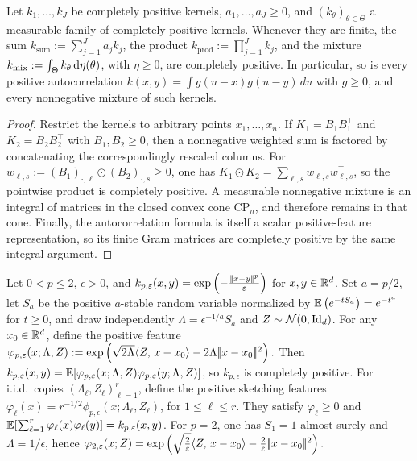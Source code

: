 \begin{prop}
\label{prop-completely-positive-kernel-closure}
Let \(k_1,\ldots,k_J\) be completely positive kernels, \(a_1,\ldots,a_J\geq0\), and \((k_\theta)_{\theta\in\Theta}\) a measurable family of completely positive kernels. Whenever they are finite, the sum \(k_{\mathrm{sum}}:=\sum_{j=1}^J a_jk_j\), the product \(k_{\mathrm{prod}}:=\prod_{j=1}^J k_j\), and the mixture \(k_{\mathrm{mix}}:=\int_\Theta k_\theta\,\mathrm{d}\eta(\theta)\), with \(\eta\geq0\), are completely positive. In particular, so is every positive autocorrelation
$k(x,y)=\int g(u-x)g(u-y)\,du$ with $g\geq0$,
and every nonnegative mixture of such kernels.
\end{prop}
\begin{proof}
Restrict the kernels to arbitrary points \(x_1,\ldots,x_n\). If \(K_1=B_1B_1^\top\) and \(K_2=B_2B_2^\top\) with \(B_1,B_2\geq0\), then a nonnegative weighted sum is factored by concatenating the correspondingly rescaled columns. For \(w_{\ell,s}:=(B_1)_{\cdot,\ell}\odot(B_2)_{\cdot,s}\geq0\), one has \(K_1\odot K_2=\sum_{\ell,s}w_{\ell,s}w_{\ell,s}^\top\), so the pointwise product is completely positive. A measurable nonnegative mixture is an integral of matrices in the closed convex cone \(\mathrm{CP}_n\), and therefore remains in that cone. Finally, the autocorrelation formula is itself a scalar positive-feature representation, so its finite Gram matrices are completely positive by the same integral argument.
\end{proof}
\begin{prop}
\label{prop-gaussian-positive-features}
Let \(0<p\leq2\), \(\epsilon>0\), and
$k_{p,\varepsilon}(x,y) = \exp\left( -\frac{|\!| x-y |\!|^p}{\varepsilon} \right)$ for $x,y\in\mathbb{R}^d$.
Set \(a=p/2\), let \(S_a\) be the positive \(a\)-stable random variable normalized by
$\mathbb{E}\left( e^{-tS_a} \right)=e^{-t^a}$ for $t\geq0$,
and draw independently \(\Lambda=\epsilon^{-1/a}S_a\) and \(Z\sim\mathcal{N}(0,\mathrm{Id}_d)\).
For any \(x_0\in\mathbb{R}^d\), define the positive feature
\(\varphi_{p,\varepsilon}(x;\Lambda,Z) := \exp\left(  \sqrt{2\Lambda}\langle Z,\,x-x_0\rangle -2\Lambda|\!| x-x_0 |\!|^2  \right).\)
Then \(k_{p,\varepsilon}(x,y)=\mathbb{E}[\varphi_{p,\varepsilon}(x;\Lambda,Z)\varphi_{p,\varepsilon}(y;\Lambda,Z)]\), so \(k_{p,\epsilon}\) is completely positive. For i.i.d.\ copies \((\Lambda_\ell,Z_\ell)_{\ell=1}^r\), define the positive sketching features \(\varphi_\ell(x)=r^{-1/2}\phi_{p,\epsilon}(x;\Lambda_\ell,Z_\ell)\), for \(1\leq\ell\leq r\).
They satisfy \(\varphi_\ell\geq0\) and \(\mathbb{E}[\sum_{\ell=1}^r\varphi_\ell(x)\varphi_\ell(y)]=k_{p,\varepsilon}(x,y)\). For \(p=2\), one has \(S_1=1\) almost surely and \(\Lambda=1/\epsilon\), hence
\(\varphi_{2,\varepsilon}(x;Z) = \exp\left(  \sqrt{\frac{2}{\varepsilon}}\langle Z,\,x-x_0\rangle -\frac{2}{\varepsilon}|\!| x-x_0 |\!|^2  \right).\)
\end{prop}
